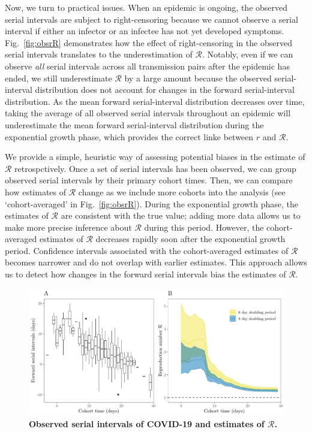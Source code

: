 \documentclass[12pt]{article}
\newcommand{\fref}[1]{Fig.~\ref{fig:#1}}
\begin{document}
Now, we turn to practical issues.
When an epidemic is ongoing, the observed serial intervals are subject to right-censoring because we cannot observe a serial interval if either an infector or an infectee has not yet developed symptoms.
\fref{obsrR} demonstrates how the effect of right-censoring in the observed serial intervals translates to the underestimation of $\mathcal R$.
Notably, even if we can observe \emph{all} serial intervals across all transmission pairs after the epidemic has ended, we still underestimate $\mathcal R$ by a large amount because the observed serial-interval distribution does not account for changes in the forward serial-interval distribution.
As the mean forward serial-interval distribution decreases over time, taking the average of all observed serial intervals throughout an epidemic will underestimate the mean forward serial-interval distribution during the exponential growth phase, which provides the correct linke between $r$ and $\mathcal R$.

We provide a simple, heuristic way of assessing potential biases in the estimate of $\mathcal R$ retrospctively.
Once a set of serial intervals has been observed, we can group observed serial intervals by their primary cohort times.
Then, we can compare how estimates of $\mathcal R$ change as we include more cohorts into the analysis (see `cohort-averaged' in \fref{obsrR}).
During the exponential growth phase, the estimates of $\mathcal R$ are consistent with the true value;
adding more data allows us to make more precise inference about $\mathcal R$ during this period.
However, the cohort-averaged estimates of $\mathcal R$ decreases rapidly soon after the exponential growth period.
Confidence intervals associated with the cohort-averaged estimates of $\mathcal R$ becomes narrower and do not overlap with earlier estimates.
This approach allows us to detect how changes in the forward serial intervals bias the estimates of $\mathcal R$.

\begin{figure}[!th]
\includegraphics[width=\textwidth]{serial_analysis.pdf}
\caption{
\textbf{Observed serial intervals of COVID-19 and estimates of $\mathcal R$.}
}
\label{fig:du}
\end{figure}
\end{document}
